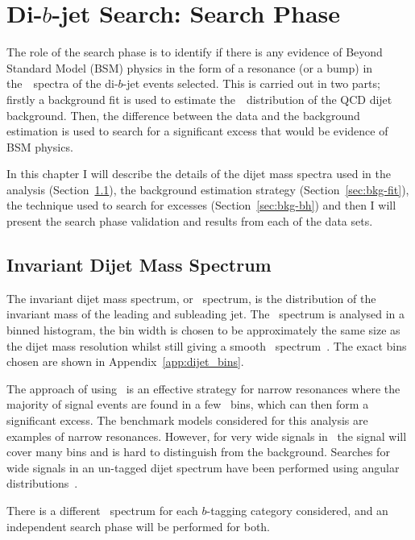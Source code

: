 \chapter{Di-$b$-jet Search: Search Phase}
\label{sec:bkg}

The role of the search phase is to identify if there is any evidence of Beyond Standard Model (BSM)
physics in the form of a resonance (or a bump) in the~\mjj~spectra of the di-$b$-jet events selected.
This is carried out in two parts; firstly a background fit is used to estimate
the~\mjj~distribution of the QCD dijet background.
Then, the difference between the data and the background estimation is used 
to search for a significant excess that would be evidence of BSM physics.

In this chapter I will describe
the details of the dijet mass  spectra used in the analysis (Section~\ref{sec:bkg-mjj}),
the background estimation strategy (Section~\ref{sec:bkg-fit}),
the technique used to search for excesses (Section~\ref{sec:bkg-bh})
and then I will present the search phase validation and results from each of the data sets.

\section{Invariant Dijet Mass Spectrum}
\label{sec:bkg-mjj}

The invariant dijet mass spectrum, or~\mjj{} spectrum,
is the distribution of the invariant mass of the leading and subleading jet.
The~\mjj{} spectrum is analysed in a binned histogram,
the bin width is chosen to be approximately the same size as the dijet mass resolution
whilst still giving a smooth~\mjj{} spectrum~\cite{dijet-mori16_int}.
The exact bins chosen are shown in Appendix~\ref{app:dijet_bins}.

The approach of using~\mjj{} is an effective strategy for narrow resonances
where the majority of signal events are found in a few~\mjj{} bins,
which can then form a significant excess.
The benchmark models considered for this analysis are examples of narrow resonances.
However, for very wide signals in~\mjj{} the signal will cover many bins and is hard to distinguish from the background.
Searches for wide signals in an un-tagged dijet spectrum have been performed using angular distributions~\cite{dijet-mori16_paper}.

There is a different~\mjj{} spectrum for each
$b$-tagging category considered,
and an independent search phase will be performed for both.

